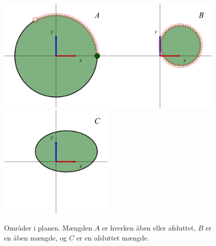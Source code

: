 \begin{figure}[h]
\centerline{\includegraphics[height=55mm]{plotDefmgd1.pdf}\quad \includegraphics[height=55mm]{plotDefmgd2.pdf}\quad \includegraphics[height=55mm]{plotDefmgd3.pdf}}
\begin{center}
\caption{Områder i planen. Mængden $A$ er hverken åben eller afsluttet, $B$ er en åben mængde, og $C$ er en afsluttet mængde.} \label{figDefMgd}
\end{center}
\end{figure}


